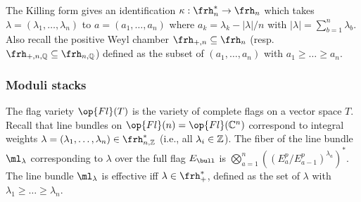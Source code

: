 The Killing form gives an identification
$\kappa:\frh_n^*\to \frh_n$ which takes $\lambda=(\lambda_1,\dots,\lambda_n)$ to $a=(a_1,\dots,a_n)$ where
$a_k=\lambda_k-|\lambda|/n$ with $|\lambda|=\sum_{b=1}^n \lambda_b$. Also recall the positive Weyl chamber
$\frh_{+,n}\subseteq  \frh_{n}$ (resp. $\frh_{+,n,\Bbb{Q}}\subseteq  \frh_{n,\Bbb{Q}}$) defined as the subset of  $(a_1,\dots,a_n)$ with $a_1\ge\dots\ge a_n$.

\subsubsection{Moduli stacks}\label{loudvoice2}
The flag variety $\op{Fl}(T)$ is the variety of complete flags on a vector space $T$. Recall that line bundles on $\op{Fl}(n)=\op{Fl}(\Bbb{C}^n)$ correspond to integral weights $\lambda=(\lambda_1,\dots,\lambda_n)\in \frh_{n,\Bbb{Z}}^*$ (i.e., all $\lambda_i\in\Bbb{Z}$). The fiber of the line bundle $\ml_{\lambda}$ corresponding to $\lambda$ over the full flag $E_{\bull}$ is
$\bigotimes_{a=1}^{n} ((E^p_a/E^p_{a-1})^{\lambda_a})^*.$ The line bundle $\ml_{\lambda}$
 is effective iff $\lambda\in \frh_{+}^*$, defined as the set of $\lambda$ with $\lambda_1\ge\dots\ge \lambda_n$.


